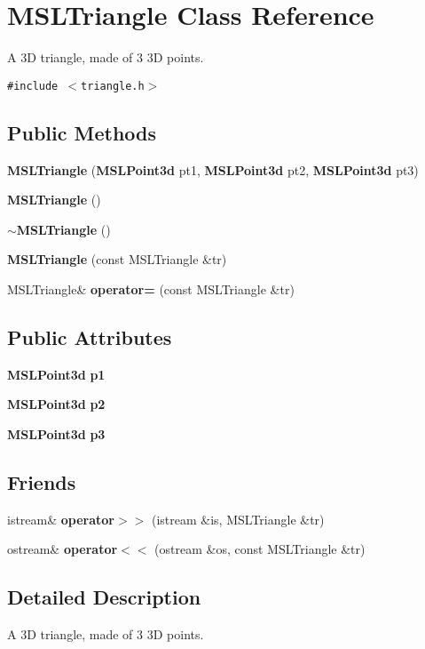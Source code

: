 \section{MSLTriangle  Class Reference}
\label{classMSLTriangle}
A 3D triangle, made of 3 3D points. 


{\tt \#include $<$triangle.h$>$}

\subsection*{Public Methods}
\begin{CompactItemize}
\item 
{\bf MSLTriangle} ({\bf MSLPoint3d} pt1, {\bf MSLPoint3d} pt2, {\bf MSLPoint3d} pt3)
\item 
{\bf MSLTriangle} ()
\item 
{\bf $\sim$MSLTriangle} ()
\item 
{\bf MSLTriangle} (const MSLTriangle \&tr)
\item 
MSLTriangle\& {\bf operator=} (const MSLTriangle \&tr)
\end{CompactItemize}
\subsection*{Public Attributes}
\begin{CompactItemize}
\item 
{\bf MSLPoint3d} {\bf p1}
\item 
{\bf MSLPoint3d} {\bf p2}
\item 
{\bf MSLPoint3d} {\bf p3}
\end{CompactItemize}
\subsection*{Friends}
\begin{CompactItemize}
\item 
istream\& {\bf operator$>$$>$} (istream \&is, MSLTriangle \&tr)
\item 
ostream\& {\bf operator$<$$<$} (ostream \&os, const MSLTriangle \&tr)
\end{CompactItemize}


\subsection{Detailed Description}
A 3D triangle, made of 3 3D points.



